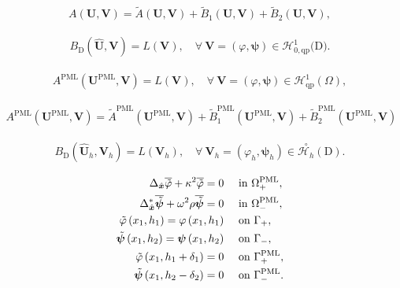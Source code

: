 \documentclass[10pt,a4paper]{amsart}
\begin{document}
\begin{align}\label{DtN varleft}
	A(\boldsymbol{U}, \boldsymbol{V})
	=\widetilde{A}(\boldsymbol{U}, \boldsymbol{V})
	+ \widetilde{B}_1(\boldsymbol{U}, \boldsymbol{V})
	+ \widetilde{B}_2(\boldsymbol{U}, \boldsymbol{V}),
\end{align}

\begin{align}\label{trun PMLvarproblem}
	B_\mathrm{D}(\hat{\boldsymbol{U}}, \boldsymbol{V})=L(\boldsymbol{V}), \quad \forall~ \boldsymbol{V}=(\varphi, \boldsymbol{\psi}) \in \mathscr{H}_{0,\mathrm{qp}}^1(\mathrm{D)}.
\end{align}

\begin{align}\label{PML varproblem}
	A^{\mathrm{PML}}(\boldsymbol{U}^{\mathrm{PML}}, \boldsymbol{V})
	=L(\boldsymbol{V}), \quad \forall ~ \boldsymbol{V}=(\varphi, \boldsymbol{\psi}) \in \mathscr{H}^1_\mathrm{qp}(\Omega),
\end{align}

\begin{align}\label{PML varleft}
	A^{\mathrm{PML}}(\boldsymbol{U}^{\mathrm{PML}}, \boldsymbol{V})
	=\widetilde{A}^{\mathrm{PML}}(\boldsymbol{U}^{\mathrm{PML}}, \boldsymbol{V})
	+\widetilde{B}_1^{\mathrm{PML}}(\boldsymbol{U}^{\mathrm{PML}}, \boldsymbol{V})
	+\widetilde{B}_2^{\mathrm{PML}}(\boldsymbol{U}^{\mathrm{PML}}, \boldsymbol{V})
\end{align}

\begin{align}\label{trun APPLvarproblem}
	B_\mathrm{D}(\hat{\boldsymbol{U}}_h, \boldsymbol{V}_h)=L(\boldsymbol{V}_h), \quad \forall~\boldsymbol{V}_h=(\varphi_h, \boldsymbol{\psi}_h) \in \stackrel{\circ}{\mathscr{H}_h}(\mathrm{D}).
\end{align}

\begin{align}\label{extenstion}
	\Delta_{\hat{\boldsymbol{x}}}  \overline{\tilde{\varphi}} + \kappa^2 \overline{\tilde{\varphi}}=0 & \quad\text { in } \Omega_+^{\mathrm{PML}}, \notag\\
	\Delta^*_{\hat{\boldsymbol{x}}}\overline{\tilde{\boldsymbol{\psi}}} +  \omega^2\rho \overline{\tilde{\boldsymbol{\psi}}} = 0 &\quad \text { in } \Omega^{\mathrm{PML}}_-, \notag\\
	\tilde{\varphi}\left(x_1, h_1\right)=\varphi\left(x_1, h_1\right) & \quad \text { on } \Gamma_+, \\
	\tilde{\boldsymbol{\psi}}\left(x_1, h_2\right)=\boldsymbol{\psi} \left(x_1, h_2\right) & \quad\text { on } \Gamma_-, \notag\\
	\tilde{\varphi}\left(x_1, h_1+\delta_1\right)=0 &\quad \text { on } \Gamma_+^{\mathrm{PML}},\notag \\
	\tilde{\boldsymbol{\psi}}\left(x_1, h_2-\delta_2\right)=0 &\quad \text { on } \Gamma_-^{\mathrm{PML}}.\notag
\end{align}
\end{document}

